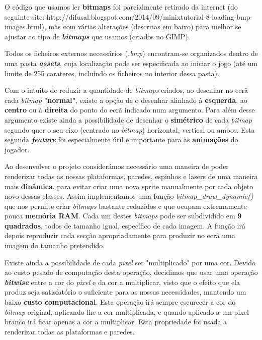 \documentclass{report}
\begin{document}
O código que usamos ler \textbf{bitmaps} foi parcialmente retirado da internet (do seguinte site:\newline
http://difusal.blogspot.com/2014/09/minixtutorial-8-loading-bmp-images.html), mas com várias alterações (descritas em baixo) para melhor se ajustar ao tipo de \textbf{\textit{bitmaps}} que usamos (criados no GIMP).

Todos os ficheiros externos necessários (\textit{.bmp}) encontram-se organizados dentro de uma pasta \textbf{\textit{assets}}, cuja localização pode ser especificada ao iniciar o jogo (até um limite de 255 carateres, incluíndo os ficheiros no interior dessa pasta).

Com o intuito de reduzir a quantidade de \textit{bitmaps} criados, ao desenhar no ecrã cada \textit{bitmap} \textbf{"normal"}, existe a opção de o desenhar alinhado à \textbf{esquerda}, ao \textbf{centro} ou à \textbf{direita} do ponto do ecrã indicado num argumento. Para além desse argumento existe ainda a possibilidade de desenhar o \textbf{simétrico} de cada \textit{bitmap} segundo quer o seu eixo (centrado no \textit{bitmap}) horizontal, vertical ou ambos. Esta segunda \textbf{\textit{feature}} foi especialmente útil e importante para as \textbf{animações} do jogador. 

Ao desenvolver o projeto considerámos necessário uma maneira de poder renderizar todas as nossas plataformas, paredes, espinhos e lasers de uma maneira mais \textbf{dinâmica}, para evitar criar uma nova sprite manualmente por cada objeto novo dessas classes. Assim implementamos uma função \textit{bitmap\_draw\_dynamic()} que nos permite criar \textit{bitmaps} bastante reduzidos e que ocupam extremamente pouca \textbf{memória RAM}. Cada um destes \textit{bitmaps} pode ser subdividido em \textbf{9 quadrados}, todos de tamanho igual, específico de cada imagem. A função irá depois reproduzir cada secção apropriadamente para produzir no ecrã uma imagem do tamanho pretendido.

Existe ainda a possibilidade de cada \textit{pixel} ser "multiplicado" por uma cor. Devido ao custo pesado de computação desta operação, decidimos que usar uma operação \textbf{\textit{bitwise}} entre a cor do \textit{pixel} e da cor a multiplicar, visto que o efeito que ela produz seja satisfatório o suficiente para as nossas necessidades, mantendo um baixo \textbf{custo computacional}. Esta operação irá sempre escurecer a cor do \textit{bitmap} original, aplicando-lhe a cor multiplicada, e quando aplicado a um pixel branco irá ficar apenas a cor a multiplicar. Esta propriedade foi usada a renderizar todas as plataformas e paredes. 
\end{document}
